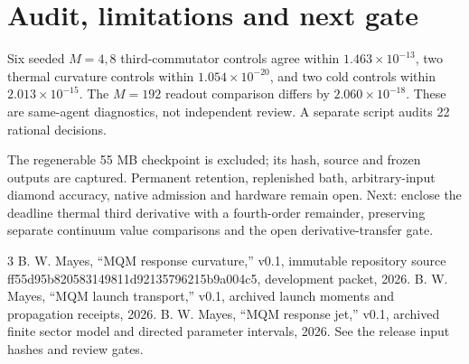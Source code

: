 \documentclass[a4paper,journal]{IEEEtran}
\begin{document}
\section{Audit, limitations and next gate}
Six seeded $M=4,8$ third-commutator controls agree within $1.463\times10^{-13}$, two thermal curvature controls within $1.054\times10^{-20}$, and two cold controls within $2.013\times10^{-15}$. The $M=192$ readout comparison differs by $2.060\times10^{-18}$. These are same-agent diagnostics, not independent review. A separate script audits 22 rational decisions.

The regenerable 55 MB checkpoint is excluded; its hash, source and frozen outputs are captured. Permanent retention, replenished bath, arbitrary-input diamond accuracy, native admission and hardware remain open. Next: enclose the deadline thermal third derivative with a fourth-order remainder, preserving separate continuum value comparisons and the open derivative-transfer gate.
\begin{thebibliography}{3}
 B. W. Mayes, ``MQM response curvature,'' v0.1, immutable repository source ff55d95b820583149811d92135796215b9a004c5, development packet, 2026.
 B. W. Mayes, ``MQM launch transport,'' v0.1, archived launch moments and propagation receipts, 2026.
 B. W. Mayes, ``MQM response jet,'' v0.1, archived finite sector model and directed parameter intervals, 2026. See the release input hashes and review gates.
\end{thebibliography}
\end{document}
